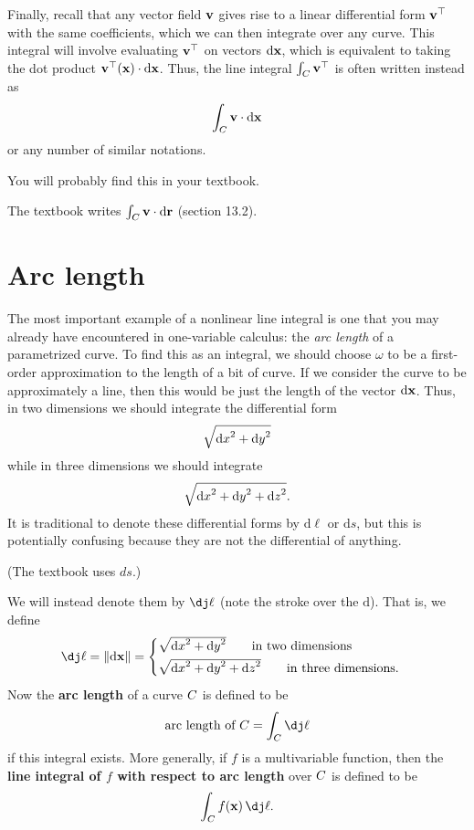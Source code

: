 \documentclass[12pt]{amsart}
\begin{document}
Finally, recall that any vector field $\mathbf{v}$ gives rise to a linear differential form ${\mathbf{v}}^\top$ with the same coefficients, which we can then integrate over any curve.
This integral will involve evaluating ${\mathbf{v}}^\top$ on vectors ${\mathrm{d} \mathbf{x}}$, which is equivalent to taking the dot product ${\mathbf{v}}^\top(\mathbf{x}) \cdot {\ensuremath{\mathrm{d} \mathbf{x}}}$.
Thus, the line integral $\int_{C} {\mathbf{v}}^\top$ is often written instead as
\[ \int_{C} \mathbf{v} \cdot {\ensuremath{\mathrm{d} \mathbf{x}}} \]
or any number of similar notations.
\begin{notextbook}You will probably find this in your textbook.\end{notextbook}
\begin{stewart}The textbook writes $\int_{C} \mathbf{v} \cdot \mathrm{d}\mathbf{r}$ (section 13.2).\end{stewart}



\section{Arc length}
\label{sec:arc-length}

The most important example of a nonlinear line integral is one that you may already have encountered in one-variable calculus: the \emph{arc length} of a parametrized curve.
To find this as an integral, we should choose $\omega$ to be a first-order approximation to the length of a bit of curve.
If we consider the curve to be approximately a line, then this would be just the length of the vector ${\mathrm{d} \mathbf{x}}$.
Thus, in two dimensions we should integrate the differential form
\[ \sqrt{{\mathrm{d} x}^2+{\mathrm{d} y}^2}\]
while in three dimensions we should integrate
\[ \sqrt{{\mathrm{d} x}^2+{\mathrm{d} y}^2 + {\mathrm{d} z}^2}.\]
It is traditional to denote these differential forms by $\mathrm{d}\ell$ or $\mathrm{d}s$, but this is potentially confusing because they are not the differential of anything.
\begin{stewart}(The textbook uses $ds$.)\end{stewart}
We will instead denote them by $\dl$ (note the stroke over the $\mathrm{d}$).
That is, we define
\[ \dl = \mgn{\dpx} =
\begin{cases}
  \sqrt{\dx^2+\dy^2}\qquad\text{in two dimensions}\\[3pt]
  \sqrt{\dx^2+\dy^2+\dz^2}\qquad\text{in three dimensions}.
\end{cases}\]
Now the \textbf{arc length} of a curve $C$ is defined to be
\[ \text{arc length of } \curve = \lint{\curve} \dl \]
if this integral exists.
More generally, if $f$ is a multivariable function, then the \textbf{line integral of $f$ with respect to arc length} over $C$ is defined to be
\[ \lint{\curve} f(\pt{x})\,\dl. \]
\end{document}
